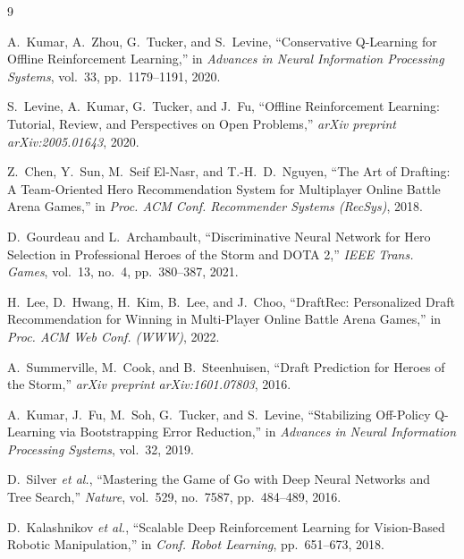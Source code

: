 \documentclass[conference]{IEEEtran}
\begin{document}
\begin{thebibliography}{9}

A.~Kumar, A.~Zhou, G.~Tucker, and S.~Levine, ``Conservative Q-Learning for Offline Reinforcement Learning,'' in \textit{Advances in Neural Information Processing Systems}, vol.~33, pp.~1179--1191, 2020.

S.~Levine, A.~Kumar, G.~Tucker, and J.~Fu, ``Offline Reinforcement Learning: Tutorial, Review, and Perspectives on Open Problems,'' \textit{arXiv preprint arXiv:2005.01643}, 2020.

Z.~Chen, Y.~Sun, M.~Seif El-Nasr, and T.-H.~D.~Nguyen, ``The Art of Drafting: A Team-Oriented Hero Recommendation System for Multiplayer Online Battle Arena Games,'' in \textit{Proc. ACM Conf. Recommender Systems (RecSys)}, 2018.

D.~Gourdeau and L.~Archambault, ``Discriminative Neural Network for Hero Selection in Professional Heroes of the Storm and DOTA 2,'' \textit{IEEE Trans. Games}, vol.~13, no.~4, pp.~380--387, 2021.

H.~Lee, D.~Hwang, H.~Kim, B.~Lee, and J.~Choo, ``DraftRec: Personalized Draft Recommendation for Winning in Multi-Player Online Battle Arena Games,'' in \textit{Proc. ACM Web Conf. (WWW)}, 2022.

A.~Summerville, M.~Cook, and B.~Steenhuisen, ``Draft Prediction for Heroes of the Storm,'' \textit{arXiv preprint arXiv:1601.07803}, 2016.

A.~Kumar, J.~Fu, M.~Soh, G.~Tucker, and S.~Levine, ``Stabilizing Off-Policy Q-Learning via Bootstrapping Error Reduction,'' in \textit{Advances in Neural Information Processing Systems}, vol.~32, 2019.

D.~Silver \textit{et al.}, ``Mastering the Game of Go with Deep Neural Networks and Tree Search,'' \textit{Nature}, vol.~529, no.~7587, pp.~484--489, 2016.

D.~Kalashnikov \textit{et al.}, ``Scalable Deep Reinforcement Learning for Vision-Based Robotic Manipulation,'' in \textit{Conf. Robot Learning}, pp.~651--673, 2018.

\end{thebibliography}
\end{document}

